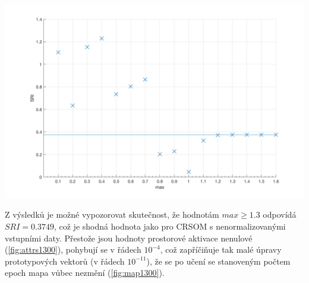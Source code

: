 \documentclass[thesis=M,czech]{FITthesis}[2012/06/26]
\begin{document}
\begin{minipage}{\textwidth}
\begin{minipage}[b]{0.19\textwidth}
\begin{tabular}{|l|c|}
        \end{tabular}
      \label{tab:sri}
    \end{minipage}
  \hfill
  \begin{minipage}[b]{0.79\textwidth}
    \centering
    \includegraphics[scale=0.2]{sri_scatter.png}
    \label{fig:sriscatter}
  \end{minipage} 
  \end{minipage}
\vspace{\baselineskip}
\noindent


Z výsledků je možné vypozorovat skutečnost, že hodnotám $max\geq1.3$ odpovídá $SRI=0.3749$, což je shodná hodnota jako pro CRSOM s nenormalizovanými vstupními daty. Přestože jsou hodnoty prostorové aktivace nenulové (\ref{fig:attrs1300}), pohybují se v řádech $10^{-4}$, což zapříčiňuje tak malé úpravy prototypových vektorů (v řádech $10^{-11}$), že se po učení se stanoveným počtem epoch mapa vůbec nezmění (\ref{fig:map1300}).
\end{document}
